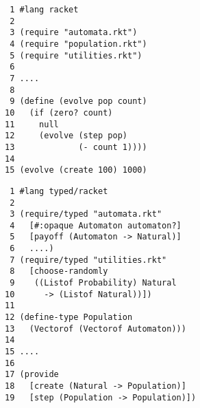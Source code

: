\begin{minipage}[t]{0.5\textwidth}
\flushleft
\begin{verbatim}
 1 #lang racket
 2
 3 (require "automata.rkt")
 4 (require "population.rkt")
 5 (require "utilities.rkt")
 6
 7 ....
 8
 9 (define (evolve pop count)
10   (if (zero? count)
11     null
12     (evolve (step pop)
13             (- count 1))))
14
15 (evolve (create 100) 1000)
\end{verbatim}
\end{minipage}%
\begin{minipage}[t]{0.4\textwidth}
  \flushleft
  \begin{verbatim}
 1 #lang typed/racket
 2
 3 (require/typed "automata.rkt"
 4   [#:opaque Automaton automaton?]
 5   [payoff (Automaton -> Natural)]
 6   ....)
 7 (require/typed "utilities.rkt"
 8   [choose-randomly
 9    ((Listof Probability) Natural
10      -> (Listof Natural))])
11 
12 (define-type Population
13   (Vectorof (Vectorof Automaton)))
14
15 ....
16
17 (provide
18   [create (Natural -> Population)]
19   [step (Population -> Population)])
\end{verbatim}
\end{minipage}
